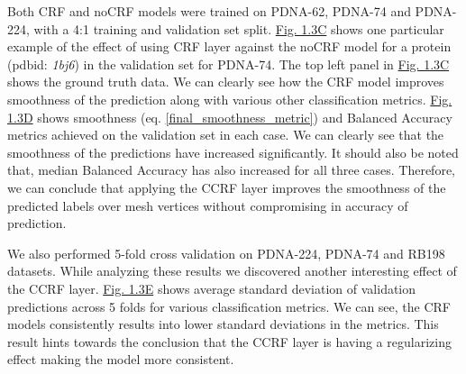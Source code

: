 Both CRF and noCRF models were trained on PDNA-62, PDNA-74 and PDNA-224, with a 4:1 training and validation set
        split. \hyperref[fig:ccrf]{Fig. 1.3C} shows one particular example 
        of the effect of using CRF layer against the noCRF model for a protein (pdbid: \textit{1bj6}) in the validation set
        for PDNA-74. The top left panel in \hyperref[fig:ccrf]{Fig. 1.3C} shows the
        ground truth data. We can clearly see how the CRF model improves smoothness of the
        prediction along with various other classification metrics. \hyperref[fig:ccrf]{Fig. 1.3D}
        shows smoothness (eq.
        \ref{final_smoothness_metric}) and Balanced Accuracy  metrics achieved on the validation set
        in each case. We can clearly see that the smoothness of the predictions have increased significantly.
        It should also be noted that, median Balanced Accuracy has also increased for all three
        cases. Therefore, we can conclude that applying the CCRF layer improves the smoothness of the
        predicted labels over mesh vertices without compromising in accuracy of prediction. 

        We also performed 5-fold cross validation on PDNA-224, PDNA-74 and RB198 datasets. While
        analyzing these results we discovered another interesting effect of the CCRF layer.
        \hyperref[fig:ccrf]{Fig. 1.3E} shows average standard deviation of validation predictions
        across 5 folds for various classification metrics. We can see, the CRF models consistently
        results into lower standard deviations in the metrics. This result hints towards the
        conclusion that the CCRF layer is having a
        regularizing effect making the model more consistent.

